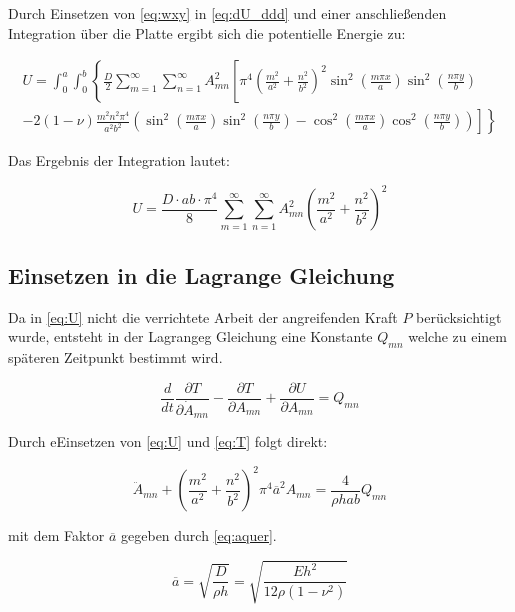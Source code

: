 Durch Einsetzen von \ref{eq:wxy} in \ref{eq:dU_ddd} und einer anschließenden Integration über die Platte ergibt sich die potentielle Energie zu:


\begin{multline}
U = \int_0^a \int_0^b \left\{
\frac{D}{2} \sum_{m = 1}^{\infty}\sum_{n = 1}^{\infty} A^2_{mn}
\left[
\pi^4 \left(\frac{m^2}{a^2} + \frac{n^2}{b^2}\right)^2
\sin^2\left(\frac{m\pi x}{a}\right) \sin^2\left(\frac{n\pi y}{b}\right)
\right.
\right. \\
\left.
\left.
-2(1-\nu) 
\frac{m^2n^2\pi^4}{a^2b^2}
\left(
\sin^2\left(\frac{m\pi x}{a}\right) 
\sin^2\left(\frac{n\pi y}{b}\right)
- 
\cos^2\left(\frac{m\pi x}{a}\right) 
\cos^2\left(\frac{n\pi y}{b}\right)
\right)
\right] 
\right\}
\end{multline}

Das Ergebnis der Integration lautet:

\begin{equation}
U = \dfrac{D \cdot a b \cdot \pi^4}{8} \sum_{m=1}^{\infty}  \sum_{n=1}^{\infty} A^2_{mn}  \left( \dfrac{m^2}{a^2} + \dfrac{n^2}{b^2}\right)^2
\label{eq:U}
\end{equation}

\subsection{Einsetzen in die Lagrange Gleichung}

Da in \ref{eq:U} nicht die verrichtete Arbeit der angreifenden Kraft $P$ berücksichtigt wurde, entsteht in der Lagrangeg Gleichung eine Konstante $Q_{mn}$ welche zu einem späteren Zeitpunkt bestimmt wird.

\begin{equation}
\dfrac{d}{dt} \dfrac{\partial T}{\partial \dot{A}_{mn}} - \dfrac{\partial T}{\partial A_{mn}} + \dfrac{\partial U}{\partial A_{mn}} = Q_{mn}
\end{equation}

Durch eEinsetzen von \ref{eq:U} und \ref{eq:T} folgt direkt:

\begin{equation}
\ddot{A}_{mn} + \left(\dfrac{m^2}{a^2} + \dfrac{n^2}{b^2}\right)^2 \pi^4 \overline{a}^2 A_{mn} = \dfrac{4}{\rho h a b} Q_{mn}
\label{eq:lagrangeDGL}
\end{equation}

\newpage

mit dem Faktor $\overline{a}$ gegeben durch \ref{eq:aquer}.


\begin{equation}\overline{a} = \sqrt{\dfrac{D}{\rho h}} = \sqrt{\dfrac{E h^2}{12 \rho (1-\nu^2)}}
\label{eq:aquer}
\end{equation}

